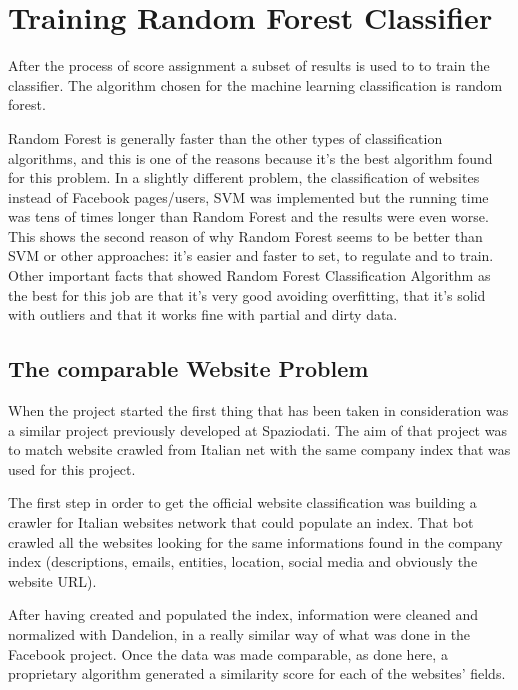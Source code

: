 \section{Training Random Forest Classifier}

After the process of score assignment a subset of results is used to to train the classifier. The algorithm chosen for the machine learning classification is random forest.


Random Forest is generally faster than the other types of classification algorithms, and this is one of the reasons because it's the best algorithm found for this problem\cite{randomforestart}. In a slightly different problem, the classification of websites instead of Facebook pages/users, SVM was implemented but the running time was tens of times longer than Random Forest and the results were even worse. This shows the second reason of why Random Forest seems to be better than SVM or other approaches: it's easier and faster to set, to regulate and to train.
Other important facts that showed Random Forest Classification Algorithm as the best for this job are that it's very good avoiding overfitting, that it's solid with outliers and that it works fine with partial and dirty data.

\subsection*{The comparable Website Problem}
When the project started the first thing that has been taken in consideration was a similar project previously developed at Spaziodati. The aim of that project was to match website crawled from Italian net with the same company index that was used for this project.

The first step in order to get the official website classification was building a crawler for Italian websites network that could populate an index. That bot crawled all the websites looking for the same informations found in the company index (descriptions, emails, entities, location, social media and obviously the website URL).

After having created and populated the index, information were cleaned and normalized with Dandelion, in a really similar way of what was done in the Facebook project. Once the data was made comparable, as done here, a proprietary algorithm generated a similarity score for each of the websites' fields.

